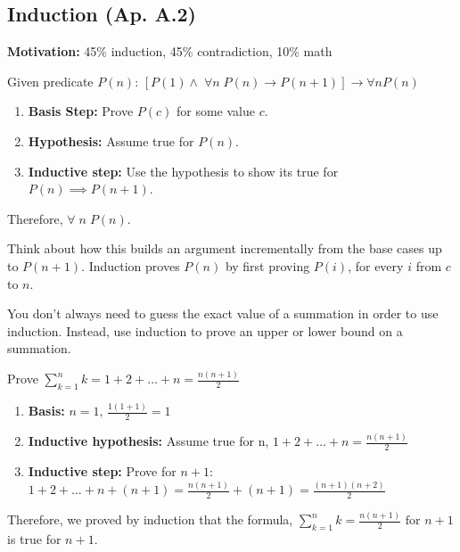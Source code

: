 \subsection{Induction (Ap. A.2)}
    \textbf{Motivation:} 45\% induction, 45\% contradiction, 10\% math
    \begin{process}
        Given predicate $P(n)$: $[P(1) \land \; \forall n \; P(n) \rightarrow P(n+1)] \rightarrow \forall n P(n)$
        \begin{enumerate}
            \item \textbf{Basis Step:} Prove $P(c)$ for some value $c$. 
            \item \textbf{Hypothesis:} Assume true for $P(n)$.
            \item \textbf{Inductive step:} Use the hypothesis to show its true for $P(n) \implies P(n+1)$.
        \end{enumerate}
        Therefore, $\forall \; n \; P(n)$.
    \end{process}

    \begin{intuition}
        Think about how this builds an argument incrementally from the base cases up to $P(n+1)$. Induction proves $P(n)$ by first proving $P(i)$, for every $i$ from $c$ to $n$.
    \end{intuition}

    \begin{intuition}
        You don't always need to guess the exact value of a summation in order to use induction. Instead, use induction to prove an upper or lower bound on a summation.
    \end{intuition}

    \begin{example}
        Prove $\sum_{k=1}^{n} k = 1 + 2 + \ldots + n = \frac{n(n+1)}{2}$
        \begin{enumerate}
            \item \textbf{Basis:} $n=1 \text{, } \frac{1(1+1)}{2} = 1$
            \item \textbf{Inductive hypothesis:} Assume true for n, $1 + 2 + \ldots + n = \frac{n(n+1)}{2}$
            \item \textbf{Inductive step:} Prove for $n+1$: $1 + 2 + \ldots + n + (n+1) = \frac{n(n+1)}{2} + (n+1) = \frac{(n+1)(n+2)}{2}$
        \end{enumerate}
        Therefore, we proved by induction that the formula, $\sum_{k=1}^{n} k = \frac{n(n+1)}{2} \text{ for } n+1$ is true for $n+1$.
    \end{example}

